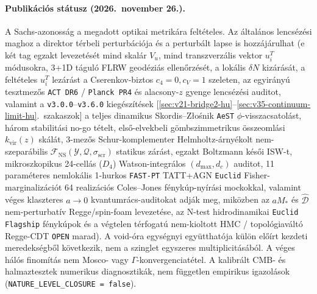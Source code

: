 \documentclass[11pt,a4paper]{article}
\begin{document}
\paragraph{Publikációs státusz (2026.\ november 26.).}
A Sachs-azonosság a megadott optikai metrikára feltételes. Az általános
lencsézési maghoz a direktor térbeli perturbációja és a perturbált lapse
is hozzájárulhat (e két tag egzakt levezetését mind skalár $V_u$, mind
transzverzális vektor $u_i^T$ módusokra, 3+1D táguló FLRW geodéziás
ellenőrzését, a lokális $\delta N$ kizárását, a feltételes $u_i^T$ lezárást
a Cserenkov-biztos $c_4 = 0, c_V = 1$ szeleten, az egyirányú tesztmezős
\texttt{ACT DR6} / \texttt{Planck PR4} és alacsony-$z$ gyenge lencsézési
auditot, valamint a \texttt{v3.0.0}--\texttt{v3.6.0} kiegészítések [\ref{sec:v21-bridge2-hu}--\ref{sec:v35-continuum-limit-hu}.~szakaszok] a teljes dinamikus Skordis--Z{\l}o\'snik
\texttt{AeST} $\phi$-visszacsatolást, három stabilitási no-go tételt,
első-elvekbeli gömbszimmetrikus összeomlási $k_{\mathrm{vir}}(z)$ skálát,
3-mezős Schur-komplementer Helmholtz-árnyékolt nem-szeparábilis $\mathcal{F}_{\mathrm{NS}}(\mathcal{Y},\mathcal{Q},\sigma_{\mathrm{scr}})$ statikus zárást,
egzakt Boltzmann késői ISW-t, mikroszkopikus 24-cellás ($D_4$) Watson-integrálos $(d_{\max}, d_c)$ auditot,
11 paraméteres nemlokális 1-hurkos \texttt{FAST-PT} TATT+AGN \texttt{Euclid} Fisher-marginalizációt
64 realizációs Coles--Jones fénykúp-nyírási mockokkal, valamint véges klaszteres $a\to 0$ kvantumrács-auditokat adják meg, miközben az $a M_*$ és $\hat{\mathcal{D}}$ nem-perturbatív Regge/spin-foam levezetése, az N-test hidrodinamikai \texttt{Euclid Flagship} fénykúpok és a végtelen térfogatú nem-kioltott HMC / topológiaváltó Regge-CDT \texttt{OPEN} marad). A void-óra egységnyi együtthatója külön előírt kezdeti
meredekségből következik, nem a szinglet egyszeres multiplicitásából.
A véges hálós finomítás nem Mosco- vagy $\Gamma$-konvergenciatétel.
A kalibrált CMB- és halmaztesztek numerikus diagnosztikák, nem független
empirikus igazolások (\texttt{NATURE\_LEVEL\_CLOSURE = false}).
\end{document}
